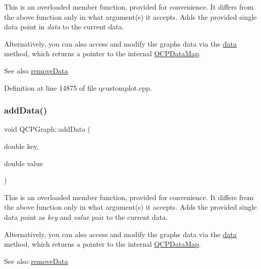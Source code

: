 This is an overloaded member function, provided for convenience. It differs from the above function only in what argument(s) it accepts. Adds the provided single data point in {\itshape data} to the current data.

Alternatively, you can also access and modify the graph\textquotesingle{}s data via the \hyperlink{class_q_c_p_graph_acde1c0d1f6a817930489548396e6b3e6}{data} method, which returns a pointer to the internal \hyperlink{qcustomplot_8h_a84a9c4a4c2216ccfdcb5f3067cda76e3}{Q\+C\+P\+Data\+Map}.

\begin{DoxySeeAlso}{See also}
\hyperlink{class_q_c_p_graph_a4a0fde50b7db9db0a85b5c5b6b10098f}{remove\+Data} 
\end{DoxySeeAlso}


Definition at line 14875 of file qcustomplot.\+cpp.

\mbox{\label{class_q_c_p_graph_a0bf98b1972286cfb7b1c4b7dd6ae2012}} 
\subsubsection{\texorpdfstring{add\+Data()}{addData()}\hspace{0.1cm}{\footnotesize\ttfamily [3/4]}}
{\footnotesize\ttfamily void Q\+C\+P\+Graph\+::add\+Data (\begin{DoxyParamCaption}\item[{double}]{key,  }\item[{double}]{value }\end{DoxyParamCaption})}

This is an overloaded member function, provided for convenience. It differs from the above function only in what argument(s) it accepts. Adds the provided single data point as {\itshape key} and {\itshape value} pair to the current data.

Alternatively, you can also access and modify the graph\textquotesingle{}s data via the \hyperlink{class_q_c_p_graph_acde1c0d1f6a817930489548396e6b3e6}{data} method, which returns a pointer to the internal \hyperlink{qcustomplot_8h_a84a9c4a4c2216ccfdcb5f3067cda76e3}{Q\+C\+P\+Data\+Map}.

\begin{DoxySeeAlso}{See also}
\hyperlink{class_q_c_p_graph_a4a0fde50b7db9db0a85b5c5b6b10098f}{remove\+Data} 
\end{DoxySeeAlso}



